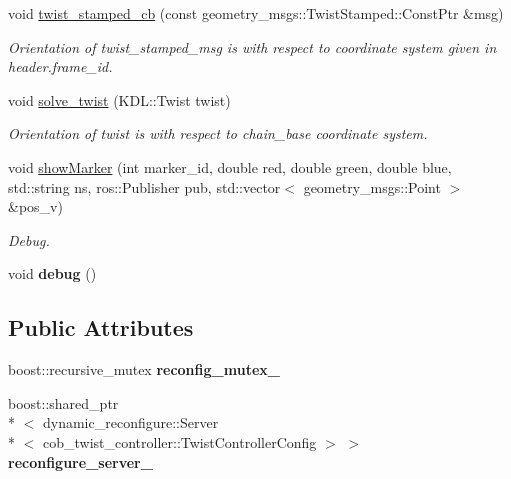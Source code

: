 \begin{DoxyCompactItemize}
\item 
\hypertarget{classCobTwistController_a5b769ea386acb685f2c553d09b6c2636}{void \hyperlink{classCobTwistController_a5b769ea386acb685f2c553d09b6c2636}{twist\-\_\-stamped\-\_\-cb} (const geometry\-\_\-msgs\-::\-Twist\-Stamped\-::\-Const\-Ptr \&msg)}\label{classCobTwistController_a5b769ea386acb685f2c553d09b6c2636}

\begin{DoxyCompactList}\small\item\em Orientation of twist\-\_\-stamped\-\_\-msg is with respect to coordinate system given in header.\-frame\-\_\-id. \end{DoxyCompactList}\item 
void \hyperlink{classCobTwistController_afe4ebcf7b22d5fb22c679e174fb61f25}{solve\-\_\-twist} (K\-D\-L\-::\-Twist twist)
\begin{DoxyCompactList}\small\item\em Orientation of twist is with respect to chain\-\_\-base coordinate system. \end{DoxyCompactList}\item 
\hypertarget{classCobTwistController_a0d04426df5a09a421510f65fd2a46e9d}{void \hyperlink{classCobTwistController_a0d04426df5a09a421510f65fd2a46e9d}{show\-Marker} (int marker\-\_\-id, double red, double green, double blue, std\-::string ns, ros\-::\-Publisher pub, std\-::vector$<$ geometry\-\_\-msgs\-::\-Point $>$ \&pos\-\_\-v)}\label{classCobTwistController_a0d04426df5a09a421510f65fd2a46e9d}

\begin{DoxyCompactList}\small\item\em Debug. \end{DoxyCompactList}\item 
\hypertarget{classCobTwistController_a48ef3bf6fc622a82f7ea7bf2f7f90464}{void {\bfseries debug} ()}\label{classCobTwistController_a48ef3bf6fc622a82f7ea7bf2f7f90464}

\end{DoxyCompactItemize}
\subsection*{Public Attributes}
\begin{DoxyCompactItemize}
\item 
\hypertarget{classCobTwistController_a1475837c311c21829eff6295d090a4d5}{boost\-::recursive\-\_\-mutex {\bfseries reconfig\-\_\-mutex\-\_\-}}\label{classCobTwistController_a1475837c311c21829eff6295d090a4d5}

\item 
\hypertarget{classCobTwistController_aeddd744f215a7cc1b0a097755ee22e4a}{boost\-::shared\-\_\-ptr\\*
$<$ dynamic\-\_\-reconfigure\-::\-Server\\*
$<$ cob\-\_\-twist\-\_\-controller\-::\-Twist\-Controller\-Config $>$ $>$ {\bfseries reconfigure\-\_\-server\-\_\-}}\label{classCobTwistController_aeddd744f215a7cc1b0a097755ee22e4a}

\end{DoxyCompactItemize}



